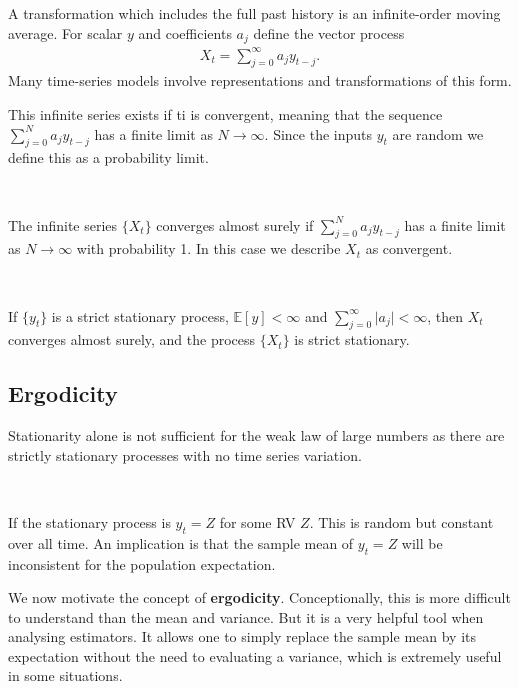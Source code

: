A transformation which includes the full past history is an infinite-order moving average.
For scalar $y$ and coefficients $a_j$ define the vector process
\begin{gather*}
    X_t = \sum_{j=0}^{\infty} a_j y_{t-j}.
\end{gather*}
Many time-series models involve representations and transformations of this form.

This infinite series exists if ti is convergent, meaning that the sequence $\sum_{j=0}^{N}a_j y_{t-j}$
has a finite limit as $N \to \infty$.  Since the inputs $y_t$ are random we define this as a probability limit.

\begin{definition}[Convergence]\label{def:convergence}
    \

    The infinite series $\{X_t\}$ converges almost surely if $\sum_{j=0}^{N} a_j y_{t-j}$
    has a finite limit as $N \to \infty$ with probability 1.
    In this case we describe $X_t$ as convergent.
    
\end{definition}
\begin{theorem}\label{thm:convergence-stationary}
    \

    If $\{y_t\}$ is a strict stationary process, $\mathbb{E}[y] < \infty$ 
    and $\sum_{j=0}^{\infty} \vert a_j \vert < \infty$,
    then $X_t$ converges almost surely,
    and the process $\{X_t\}$ is strict stationary.  
\end{theorem}

\subsection{Ergodicity}
\label{sec:ergodicity}

Stationarity alone is not sufficient for the weak law of large numbers as there are strictly stationary
processes with no time series variation.

\begin{eg}
    \
    
    If the stationary process is $y_t = Z$ for some RV $Z$.
    This is random but constant over all time. 
    An implication is that the sample mean of $y_t = Z$ will be inconsistent for the population expectation.
\end{eg}

We now motivate the concept of \textbf{ergodicity}\footnotemark. Conceptionally, this is more difficult to understand
than the mean and variance. But it is a very helpful tool when analysing estimators. It allows one
to simply replace the sample mean by its expectation without the need to evaluating a variance,
which is extremely useful in some situations.


